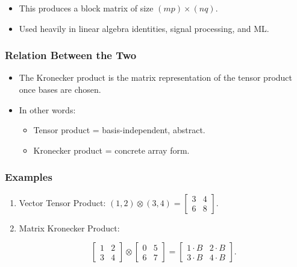 \documentclass[
  letterpaper,
  DIV=11,
  numbers=noendperiod]{scrreprt}
\providecommand{\tightlist}{%
  \setlength{\itemsep}{0pt}\setlength{\parskip}{0pt}}
\begin{document}
\begin{itemize}
\tightlist
\item
  This produces a block matrix of size \((mp) \times (nq)\).
\item
  Used heavily in linear algebra identities, signal processing, and ML.
\end{itemize}

\subsubsection{Relation Between the Two}\label{relation-between-the-two}

\begin{itemize}
\item
  The Kronecker product is the matrix representation of the tensor
  product once bases are chosen.
\item
  In other words:

  \begin{itemize}
  \tightlist
  \item
    Tensor product = basis-independent, abstract.
  \item
    Kronecker product = concrete array form.
  \end{itemize}
\end{itemize}

\subsubsection{Examples}\label{examples}

\begin{enumerate}
\def\labelenumi{\arabic{enumi}.}
\item
  Vector Tensor Product:
  \((1,2) \otimes (3,4) = \begin{bmatrix}3 & 4 \\ 6 & 8\end{bmatrix}.\)
\item
  Matrix Kronecker Product:

  \[
  \begin{bmatrix}1 & 2 \\ 3 & 4\end{bmatrix} \otimes
  \begin{bmatrix}0 & 5 \\ 6 & 7\end{bmatrix}
  =
  \begin{bmatrix}
  1\cdot B & 2\cdot B \\
  3\cdot B & 4\cdot B
  \end{bmatrix}.
  \]
\end{enumerate}
\end{document}

